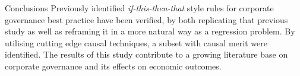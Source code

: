 \documentclass[final]{beamer}
\newlength{\onecolwid}
\begin{document}
\begin{frame}[t]
\begin{columns}[t]
\begin{column}{\onecolwid}
\begin{block}{}
	
	\begin{figure}[h!]
	\centering
	\footnotesize{}
	\footnotesize{ }
	\end{figure}
	\end{block}
	 \begin{block}{Conclusions}
          {\large \color{black} Previously identified {\it if-this-then-that} style rules for corporate governance best practice have been verified, by both replicating that previous study as well as reframing it in a more natural way as a regression problem. By utilising cutting edge causal techniques, a subset with causal merit were identified. The results of this study contribute to a growing literature base on corporate governance and its effects on economic outcomes.    }
	\end{block}
\end{column}


\end{columns}
\end{frame}
\end{document}
